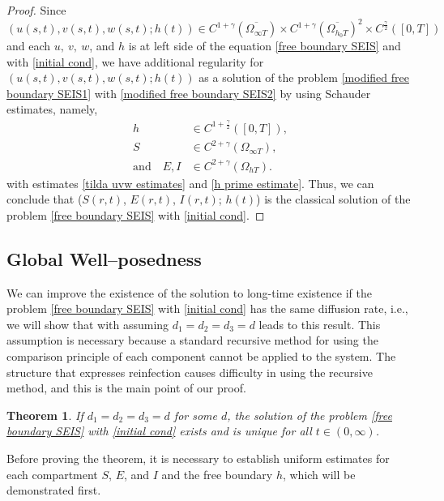 \documentclass[11pt]{amsart}
\numberwithin{equation}{section}
\theoremstyle{plain}
\newtheorem{theorem}{Theorem}[section]
\theoremstyle{definition}
\begin{document}
\begin{proof}
Since $\left(u\left(s,t\right),v\left(s,t\right),w\left(s,t\right);h\left(t\right)\right) \in C^{1+\gamma}(\overline{\Omega_{\infty T}})\times C^{1+\gamma}(\overline{\Omega_{h_0 T}})^2\times C^{\frac{\gamma}{2}}([0,T])$ and each $u,\ v,\ w$, and $h$ is at left side of the equation \cref{free boundary SEIS} and with \cref{initial cond}, we have additional regularity for $(u(s,t),v(s,t),w(s,t);h(t))$ as a solution of the problem \cref{modified free boundary SEIS1} with \cref{modified free boundary SEIS2} by using Schauder estimates, namely, 
		\begin{equation*}
			\begin{aligned}
				h &\in C^{1+\frac{\gamma}{2}}([0,T]),\\
				S &\in C^{2+\gamma}(\Omega_{\infty T}),\\
				\text{and} \quad E,I &\in C^{2+\gamma}(\Omega_{hT}).
			\end{aligned}
		\end{equation*}
		with estimates \cref{tilda uvw estimates} and \cref{h prime estimate}. Thus, we can conclude that ($S(r,t)$, $E(r,t)$, $I(r,t)$; $h(t)$) is the classical solution of the problem \cref{free boundary SEIS} with \cref{initial cond}.
	\end{proof}
	
\subsection{Global Well--posedness}
	We can improve the existence of the solution to long-time existence if the problem \cref{free boundary SEIS} with \cref{initial cond} has the same diffusion rate, i.e., we will show that with assuming $d_1=d_2=d_3=d$ leads to this result. This assumption is necessary because a standard recursive method for using the comparison principle of each component cannot be applied to the system. The structure that expresses reinfection causes difficulty in using the recursive method, and this is the main point of our proof.
	
	\begin{theorem} \label{longtime}
		If $d_1=d_2=d_3=d$ for some $d$, the solution of the problem \cref{free boundary SEIS} with \cref{initial cond} exists and is unique for all $t \in (0,\infty)$.
	\end{theorem}
	
Before proving the theorem, it is necessary to establish uniform estimates for each compartment $S$, $E$, and $I$ and the free boundary $h$, which will be demonstrated first.
	
\end{document}
